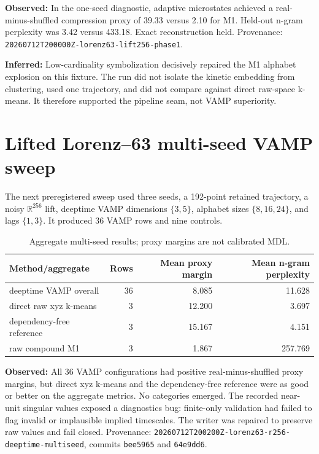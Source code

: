 \documentclass[11pt]{article}
\newcommand{\observed}{\textbf{Observed:}}
\newcommand{\inferred}{\textbf{Inferred:}}
\begin{document}
\observed{} In the one-seed diagnostic, adaptive microstates achieved a
real-minus-shuffled compression proxy of 39.33 versus 2.10 for M1. Held-out
n-gram perplexity was 3.42 versus 433.18. Exact reconstruction held. Provenance:
\texttt{20260712T200000Z-lorenz63-lift256-phase1}.

\inferred{} Low-cardinality symbolization decisively repaired the M1 alphabet
explosion on this fixture. The run did not isolate the kinetic embedding from
clustering, used one trajectory, and did not compare against direct raw-space
k-means. It therefore supported the pipeline seam, not VAMP superiority.

\section{Lifted Lorenz--63 multi-seed VAMP sweep}

The next preregistered sweep used three seeds, a 192-point retained trajectory,
a noisy $\mathbb{R}^{256}$ lift, deeptime VAMP dimensions $\{3,5\}$, alphabet
sizes $\{8,16,24\}$, and lags $\{1,3\}$. It produced 36 VAMP rows and nine
controls.

\begin{table}[ht]
\centering\small
\begin{tabular}{lrrr}
\toprule
Method/aggregate & Rows & Mean proxy margin & Mean n-gram perplexity \\
\midrule
deeptime VAMP overall & 36 & 8.085 & 11.628 \\
direct raw xyz k-means & 3 & 12.200 & 3.697 \\
dependency-free reference & 3 & 15.167 & 4.151 \\
raw compound M1 & 3 & 1.867 & 257.769 \\
\bottomrule
\end{tabular}
\caption{Aggregate multi-seed results; proxy margins are not calibrated MDL.}
\end{table}

\observed{} All 36 VAMP configurations had positive real-minus-shuffled proxy
margins, but direct xyz k-means and the dependency-free reference were as good
or better on the aggregate metrics. No categories emerged. The recorded
near-unit singular values exposed a diagnostics bug: finite-only validation had
failed to flag invalid or implausible implied timescales. The writer was repaired
to preserve raw values and fail closed. Provenance:
\texttt{20260712T200200Z-lorenz63-r256-deeptime-multiseed}, commits
\texttt{bee5965} and \texttt{64e9dd6}.
\end{document}
